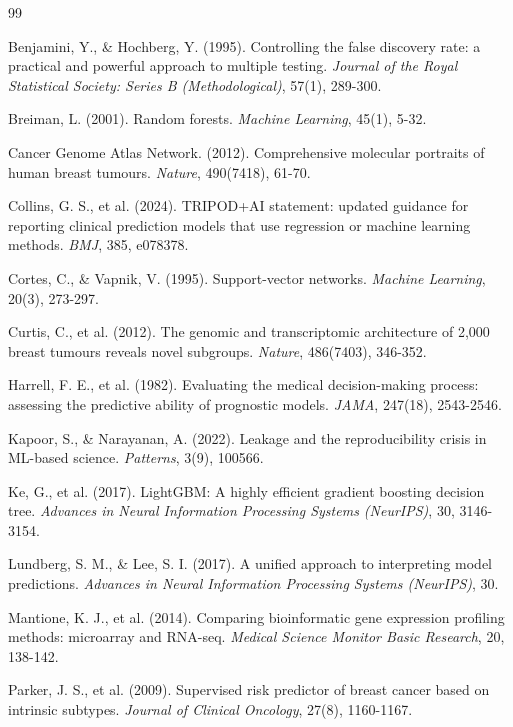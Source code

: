 \documentclass[10pt,a4paper,twocolumn]{article}
\begin{document}
\clearpage
\begin{thebibliography}{99}

 Benjamini, Y., \& Hochberg, Y. (1995). Controlling the false discovery rate: a practical and powerful approach to multiple testing. \textit{Journal of the Royal Statistical Society: Series B (Methodological)}, 57(1), 289-300.

 Breiman, L. (2001). Random forests. \textit{Machine Learning}, 45(1), 5-32.

 Cancer Genome Atlas Network. (2012). Comprehensive molecular portraits of human breast tumours. \textit{Nature}, 490(7418), 61-70.

 Collins, G. S., et al. (2024). TRIPOD+AI statement: updated guidance for reporting clinical prediction models that use regression or machine learning methods. \textit{BMJ}, 385, e078378.

 Cortes, C., \& Vapnik, V. (1995). Support-vector networks. \textit{Machine Learning}, 20(3), 273-297.

 Curtis, C., et al. (2012). The genomic and transcriptomic architecture of 2,000 breast tumours reveals novel subgroups. \textit{Nature}, 486(7403), 346-352.

 Harrell, F. E., et al. (1982). Evaluating the medical decision-making process: assessing the predictive ability of prognostic models. \textit{JAMA}, 247(18), 2543-2546.

 Kapoor, S., \& Narayanan, A. (2022). Leakage and the reproducibility crisis in ML-based science. \textit{Patterns}, 3(9), 100566.

 Ke, G., et al. (2017). LightGBM: A highly efficient gradient boosting decision tree. \textit{Advances in Neural Information Processing Systems (NeurIPS)}, 30, 3146-3154.

 Lundberg, S. M., \& Lee, S. I. (2017). A unified approach to interpreting model predictions. \textit{Advances in Neural Information Processing Systems (NeurIPS)}, 30.

 Mantione, K. J., et al. (2014). Comparing bioinformatic gene expression profiling methods: microarray and RNA-seq. \textit{Medical Science Monitor Basic Research}, 20, 138-142.

 Parker, J. S., et al. (2009). Supervised risk predictor of breast cancer based on intrinsic subtypes. \textit{Journal of Clinical Oncology}, 27(8), 1160-1167.


\end{thebibliography}
\end{document}
